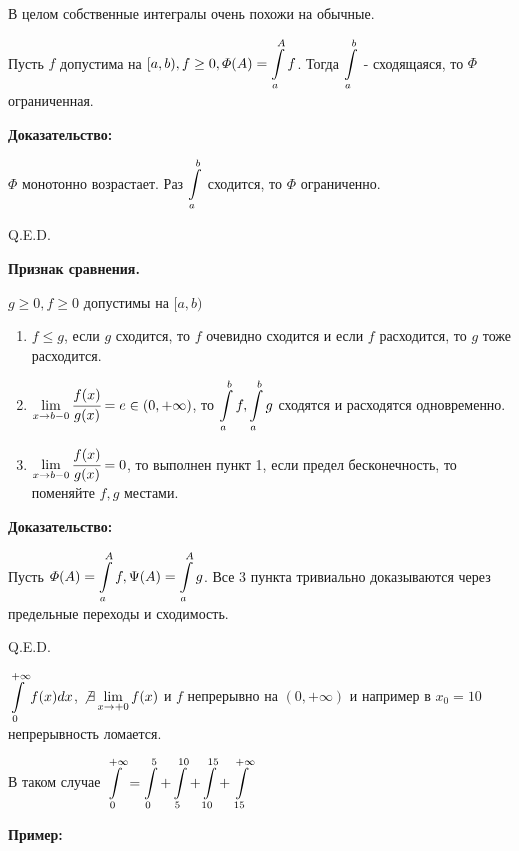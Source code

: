 В целом собственные интегралы очень похожи на обычные.



Пусть $f$ допустима на $[a,b), f\geq 0, \varPhi(A) = \displaystyle\int\limits_{a}^{A}f$.  Тогда $\displaystyle\int\limits_{a}^{b}$ - сходящаяся, то $\varPhi$ ограниченная.

\textbf{Доказательство:}

$\varPhi$ монотонно возрастает. Раз $\displaystyle\int\limits_{a}^{b}$ сходится, то $\varPhi$ ограниченно.

\hfill  Q.E.D.

\textbf{Признак сравнения.}

$g \geq 0 ,f \geq 0$ допустимы на $[a,b)$

\begin{enumerate}
    \item $f\leq g$, если $g$ сходится, то $f$ очевидно сходится и если $f$ расходится, то $g$ тоже расходится.
    \item $\lim\limits_{x\rightarrow b-0} \cfrac{f(x)}{g(x)} = e\in (0, +\infty)$, то $\displaystyle\int\limits_{a}^{b}f,\displaystyle\int\limits_{a}^{b}g$ сходятся и расходятся одновременно.
    \item $\lim\limits_{x\rightarrow b-0}\cfrac{f(x)}{g(x)}=0$, то выполнен пункт 1, если предел бесконечность, то поменяйте $f,g$ местами.
\end{enumerate}

\textbf{Доказательство:}

Пусть $\varPhi(A) = \displaystyle\int\limits_{a}^{A}f, \Psi(A) = \displaystyle\int\limits_{a}^{A}g$. Все 3 пункта тривиально доказываются через предельные переходы и сходимость.

\hfill Q.E.D.

 $\displaystyle\int\limits_{0}^{+\infty}f(x)dx$,  $\not \exists \lim\limits_{x \rightarrow+0}f(x)$ и $f$ непрерывно на $(0, +\infty)$ и например в $x_0=10$ непрерывность ломается.

В таком случае $\displaystyle\int\limits_{0}^{+\infty} = \displaystyle\int\limits_{0}^{5} + \displaystyle\int\limits_{5}^{10} + \displaystyle\int\limits_{10}^{15} + \displaystyle\int\limits_{15}^{+\infty}$

\textbf{Пример:}

